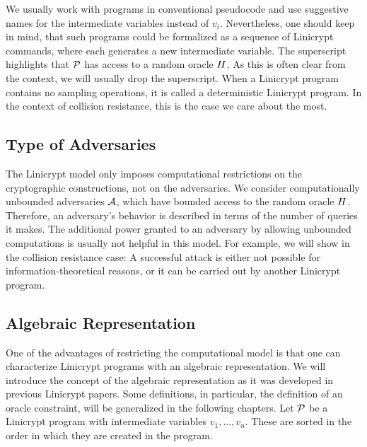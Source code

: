 We usually work with programs in conventional pseudocode and use suggestive names for the intermediate variables instead of $v_i$.
Nevertheless, one should keep in mind,
that such programs could be formalized as a sequence of Linicrypt commands,
where each generates a new intermediate variable.
The superscript highlights that $\P$ has access to a random oracle $\H$.
As this is often clear from the context, we will usually drop the superscript.
When a Linicrypt program contains no sampling operations, it is called a deterministic Linicrypt program. 
In the context of collision resistance, this is the case we care about the most.

\subsection{Type of Adversaries}
The Linicrypt model only imposes computational restrictions on the cryptographic constructions,
not on the adversaries.
We consider computationally unbounded adversaries $\A$,
which have bounded access to the random oracle $\H$.
Therefore, an adversary's behavior is described in terms of the number of queries it makes.
The additional power granted to an adversary by allowing unbounded computations is usually not helpful in this model.
For example, we will show in the collision resistance case:
A successful attack is either not possible for information-theoretical reasons,
or it can be carried out by another Linicrypt program.

\subsection{Algebraic Representation}

One of the advantages of restricting the computational model is that one can characterize Linicrypt programs with an algebraic representation.
We will introduce the concept of the algebraic representation as it was developed in previous Linicrypt papers.
Some definitions, in particular, the definition of an oracle constraint, will be generalized in the following chapters.
Let $\P$ be a Linicrypt program with intermediate variables $v_1, \dots, v_n$.
These are sorted in the order in which they are created in the program.

